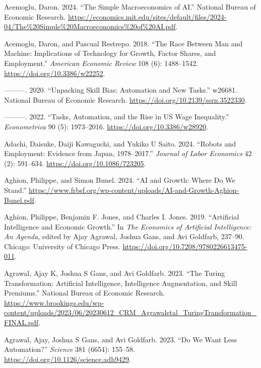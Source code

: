 \documentclass[
  11pt,
  letterpaper,
  DIV=11,
  numbers=noendperiod,
  oneside]{scrartcl}
\newlength{\cslhangindent}
\newenvironment{CSLReferences}[2] %
 {\begin{list}{}{%
  \setlength{\itemindent}{0pt}
  \setlength{\leftmargin}{0pt}
  \setlength{\parsep}{0pt}
  \ifodd #1
   \setlength{\leftmargin}{\cslhangindent}
   \setlength{\itemindent}{-1\cslhangindent}
  \fi
  \setlength{\itemsep}{#2\baselineskip}}}
 {\end{list}}
\begin{document}
\label{refs}
\begin{CSLReferences}{1}{0}
Acemoglu, Daron. 2024. {``The Simple Macroeconomics of AI.''} National
Bureau of Economic Research.
\url{https://economics.mit.edu/sites/default/files/2024-04/The\%20Simple\%20Macroeconomics\%20of\%20AI.pdf}.

Acemoglu, Daron, and Pascual Restrepo. 2018. {``The Race Between Man and
Machine: Implications of Technology for Growth, Factor Shares, and
Employment.''} \emph{American Economic Review} 108 (6): 1488--1542.
\url{https://doi.org/10.3386/w22252}.

---------. 2020. {``Unpacking Skill Bias: Automation and New Tasks.''}
w26681. National Bureau of Economic Research.
\url{https://doi.org/10.2139/ssrn.3522330}.

---------. 2022. {``Tasks, Automation, and the Rise in US Wage
Inequality.''} \emph{Econometrica} 90 (5): 1973--2016.
\url{https://doi.org/10.3386/w28920}.

Adachi, Daisuke, Daiji Kawaguchi, and Yukiko U Saito. 2024. {``Robots
and Employment: Evidence from Japan, 1978--2017.''} \emph{Journal of
Labor Economics} 42 (2): 591--634. \url{https://doi.org/10.1086/723205}.

Aghion, Philippe, and Simon Bunel. 2024. {``AI and Growth: Where Do We
Stand.''}
\url{https://www.frbsf.org/wp-content/uploads/AI-and-Growth-Aghion-Bunel.pdf}.

Aghion, Philippe, Benjamin F. Jones, and Charles I. Jones. 2019.
{``Artificial Intelligence and Economic Growth.''} In \emph{The
Economics of Artificial Intelligence: An Agenda}, edited by Ajay
Agrawal, Joshua Gans, and Avi Goldfarb, 237--90. Chicago: University of
Chicago Press. \url{https://doi.org/10.7208/9780226613475-011}.

Agrawal, Ajay K, Joshua S Gans, and Avi Goldfarb. 2023. {``The Turing
Transformation: Artificial Intelligence, Intelligence Augmentation, and
Skill Premiums.''} National Bureau of Economic Research.
\url{https://www.brookings.edu/wp-content/uploads/2023/06/20230612_CRM_Agrawaletal_TuringTransformation_FINAL.pdf}.

Agrawal, Ajay, Joshua S Gans, and Avi Goldfarb. 2023. {``Do We Want Less
Automation?''} \emph{Science} 381 (6654): 155--58.
\url{https://doi.org/10.1126/science.adh9429}.


\end{CSLReferences}
\end{document}
